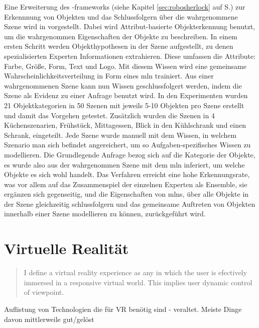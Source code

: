 Eine Erweiterung des \robosherlock-\glspl{framework} (siehe Kapitel \ref{sec:robosherlock} auf S.\pageref{sec:robosherlock}) zur Erkennnung von Objekten und das Schlussfolgern über die wahrgenommene Szene wird in \cite{pr2looking} vorgestellt. Dabei wird Attribut-basierte Objekterkennung benutzt, um die wahrgenommen Eigenschaften der Objekte zu beschreiben. In einem ersten Schritt werden Objekthypothesen in der Szene aufgestellt, zu denen spezialisierten Experten Informationen extrahieren. Diese umfassen die Attribute: Farbe, Größe, Form, Text und Logo. Mit diesem Wissen wird eine gemeinsame Wahrscheinlichkeitsverteilung in Form eines \gls{mln} trainiert. Aus einer wahrgenommenen Szene kann nun Wissen geschlussfolgert werden, indem die Szene als Evidenz zu einer Anfrage benutzt wird. In den Experimenten wurden 21 Objektkategorien in 50 Szenen mit jeweils 5-10 Objekten pro Szene erstellt und damit das Vorgehen getestet. Zusätzlich wurden die Szenen in 4 Küchenszenarien, Frühstück, Mittagessen, Blick in den Kühlschrank und einen Schrank, eingeteilt. Jede Szene wurde manuell mit dem Wissen, in welchem Szenario man sich befindet angereichert, um so Aufgaben-spezifisches Wissen zu modellieren. Die Grundlegende Anfrage bezog sich auf die Kategorie der Objekte, es wurde also aus der wahrgenommen Szene mit dem \gls{mln} inferiert, um welche Objekte es sich wohl handelt. Das Verfahren erreicht eine hohe Erkennungsrate, was vor allem auf das Zusammenspiel der einzelnen Experten als Ensemble, sie ergänzen sich gegenseitig, und die Eigenschaften von \glspl{mln}, über alle Objekte in der Szene gleichzeitig schlussfolgern und das gemeinsame Auftreten von Objekten innerhalb einer Szene modellieren zu können, zurückgeführt wird.

\section{Virtuelle Realität}

\cite{brooks} \newline
\begin{quote}
\glqq I define a virtual reality experience as any in which the user is efectively immersed in a responsive virtual world. This implies user dynamic control of viewpoint.\grqq
\end{quote}
Auflistung von Technologien die für VR benötig sind - veraltet. Meiste Dinge davon mittlerweile gut/gelöst \par

